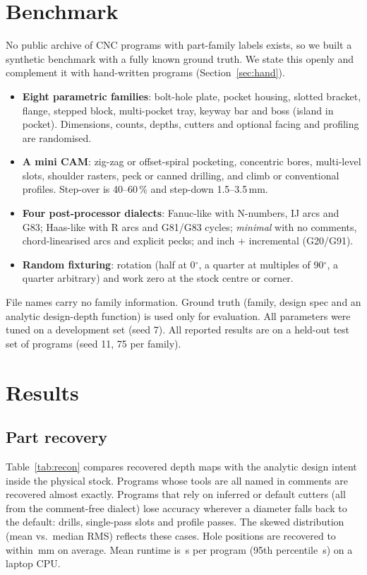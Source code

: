 \documentclass[conference]{IEEEtran}
\begin{document}
\section{Benchmark}
No public archive of CNC programs with part-family labels exists, so we built
a synthetic benchmark with a fully known ground truth. We state this openly and
complement it with hand-written programs (Section~\ref{sec:hand}).
\begin{itemize}
\item \textbf{Eight parametric families}: bolt-hole plate, pocket housing,
slotted bracket, flange, stepped block, multi-pocket tray, keyway bar and boss
(island in pocket). Dimensions, counts, depths, cutters and optional facing
and profiling are randomised.
\item \textbf{A mini CAM}: zig-zag or offset-spiral pocketing, concentric
bores, multi-level slots, shoulder rasters, peck or canned drilling, and
climb or conventional profiles. Step-over is 40--60\,\% and step-down 1.5--3.5\,mm.
\item \textbf{Four post-processor dialects}: Fanuc-like with N-numbers, IJ arcs
and G83; Haas-like with R arcs and G81/G83 cycles; \emph{minimal} with no
comments, chord-linearised arcs and explicit pecks; and inch + incremental
(G20/G91).
\item \textbf{Random fixturing}: rotation (half at 0$^\circ$, a quarter at
multiples of 90$^\circ$, a quarter arbitrary) and work zero at the stock
centre or corner.
\end{itemize}
File names carry no family information. Ground truth (family, design spec and
an analytic design-depth function) is used only for evaluation. All parameters
were tuned on a development set (seed 7). All reported results are on a
held-out test set of \NProg{} programs (seed 11, 75 per family).

\section{Results}
\subsection{Part recovery}
Table~\ref{tab:recon} compares recovered depth maps with the analytic design
intent inside the physical stock. Programs whose tools are all named in
comments are recovered almost exactly. Programs that rely on inferred or
default cutters (all from the comment-free dialect) lose accuracy wherever a
diameter falls back to the default: drills, single-pass slots and profile
passes. The skewed distribution (mean vs.\ median RMS) reflects these cases. Hole positions are recovered to within
\RecAllHolePos{}\,mm on average. Mean runtime is \RunMean{}\,s per program
(95th percentile \RunPNF{}\,s) on a laptop CPU.
\end{document}
